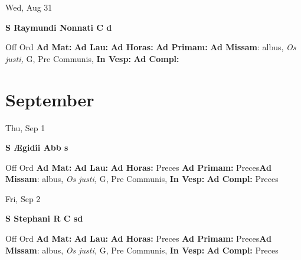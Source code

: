 \documentclass[10pt]{book}
\begin{document}
\begin{center}
\begin{minipage}{3.5in}
\vspace{2em}
\begin{center}Wed, Aug 31
\end{center}
\textbf{ \large S Raymundi Nonnati C
\textnormal{\normalsize d}}

\begin{justify}Off Ord
\textbf{Ad Mat: }
\textbf{Ad Lau: }
\textbf{Ad Horas: }
\textbf{Ad Primam: }\textbf{Ad Missam}: albus, \textit{Os justi,} G, Pre Communis, 
\textbf{In Vesp: }
\textbf{Ad Compl: }
\end{justify}
\end{minipage}
\end{center}

    \chapter*{September}
                    
\begin{center}
\begin{minipage}{3.5in}
\vspace{2em}
\begin{center}Thu, Sep 1
\end{center}
\textbf{ \large S Ægidii Abb
\textnormal{\normalsize s}}

\begin{justify}Off Ord
\textbf{Ad Mat: }
\textbf{Ad Lau: }
\textbf{Ad Horas: }Preces
\textbf{Ad Primam: }Preces\textbf{Ad Missam}: albus, \textit{Os justi,} G, Pre Communis, 
\textbf{In Vesp: }
\textbf{Ad Compl: }Preces
\end{justify}
\end{minipage}
\end{center}

\begin{center}
\begin{minipage}{3.5in}
\vspace{2em}
\begin{center}Fri, Sep 2
\end{center}
\textbf{ \large S Stephani R C
\textnormal{\normalsize sd}}

\begin{justify}Off Ord
\textbf{Ad Mat: }
\textbf{Ad Lau: }
\textbf{Ad Horas: }Preces
\textbf{Ad Primam: }Preces\textbf{Ad Missam}: albus, \textit{Os justi,} G, Pre Communis, 
\textbf{In Vesp: }
\textbf{Ad Compl: }Preces
\end{justify}
\end{minipage}
\end{center}
\end{document}
